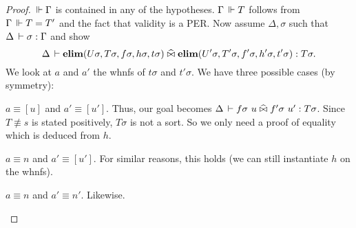 \documentclass[a4paper,english]{lipics-utf8x}
\begin{document}
  \begin{proof}
    $\,\Vdash \Gamma$ is contained in any of the hypotheses.
    $\Gamma \,\Vdash T$ follows from $\Gamma \,\Vdash T = T'$ and the fact that validity
    is a PER.
    Now assume $\Delta, \sigma$ such that
    $\Delta \,\vdash \sigma : \Gamma$ and
    show
    \[\Delta \,\vdash \operatorname{\mathbf{elim}}(U \sigma,T \sigma,f \sigma,h \sigma,t \sigma) \mathrel{\widehat{\bowtie}}
    \operatorname{\mathbf{elim}}(U' \sigma,T' \sigma,f' \sigma,h' \sigma,t' \sigma) : T \sigma.\]
    We look at $a$ and $a'$ the whnfs of $t \sigma$ and $t' \sigma$.
    We have three possible cases (by symmetry):
    \begin{caselist}
      \nextcase $a \equiv [u]$ and $a' \equiv [u']$.
      Thus, our goal becomes
      $\Delta \der f \sigma\ u \hEr f' \sigma\ u' : T \sigma$.
      Since $T \nequiv s$ is stated positively, $T \sigma$ is not a
      sort. So we only need a proof of equality which is deduced from $h$.

      \nextcase $a \equiv n$ and $a' \equiv [u']$.
      For similar reasons, this holds (we can still instantiate $h$ on the
      whnfs).

      \nextcase $a \equiv n$ and $a' \equiv n'$.
      Likewise.
    \end{caselist}
  \end{proof}

  \begin{lemma}
    \leavevmode
    \begin{mathc}
    \end{mathc}
  \end{lemma}
\end{document}
